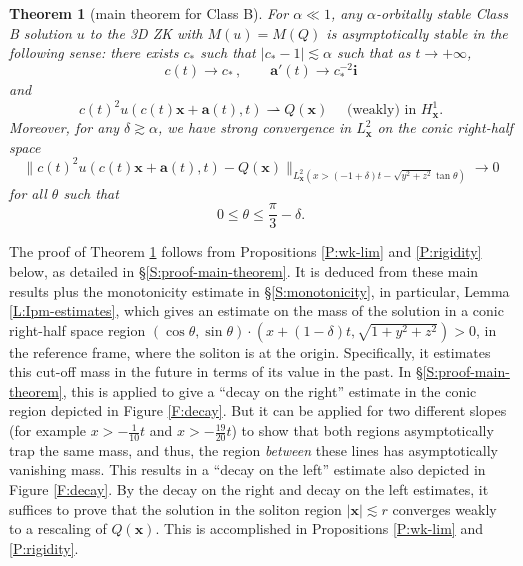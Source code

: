 \documentclass[12pt,letterpaper]{amsart}
\newtheorem{theorem}{Theorem}
\theoremstyle{remark}
\numberwithin{equation}{section}
\numberwithin{theorem}{section}
\numberwithin{table}{section}
\begin{document}
\begin{theorem}[main theorem for Class B]
\label{T:main}
For $\alpha \ll 1$, any $\alpha$-orbitally stable Class B solution $u$ to the 3D ZK with $M(u)=M(Q)$ is \emph{asymptotically stable} in the following sense:  there exists $c_*$ such that $|c_*-1| \lesssim \alpha$ such that as $t\to +\infty$, 
$$
c(t) \to c_* \,,  \qquad \mathbf{a}'(t) \to c_*^{-2} \mathbf{i}
$$
and 
$$
c(t)^2 u(c(t) \mathbf{x} + \mathbf{a}(t),t) \rightharpoonup Q(\mathbf{x}) \quad \text{ (weakly) in } H_{\mathbf{x}}^1.
$$  
Moreover, for any $\delta\gtrsim \alpha$, we have strong convergence in $L^2_{\mathbf{x}}$ on the conic right-half space
\begin{equation}
\label{E:window-conv}
\| c(t)^2 u(c(t) \mathbf{x} + \mathbf{a}(t),t) - Q(\mathbf{x}) \|_{L^2_{\mathbf{x}}(x> (-1+\delta) t -\sqrt{y^2+z^2}\tan \theta )} \to 0
\end{equation}
for all $\theta$ such that 
$$0\leq  \theta \leq \frac{\pi}{3}-\delta.$$
\end{theorem}

The proof of Theorem \ref{T:main} follows from Propositions \ref{P:wk-lim} and \ref{P:rigidity} below, as detailed in \S \ref{S:proof-main-theorem}.  It is deduced from these main results plus the monotonicity estimate in \S\ref{S:monotonicity}, in particular, Lemma \ref{L:Ipm-estimates}, which gives an estimate on the mass of the solution in a conic right-half space region $(\cos \theta, \sin\theta) \cdot (x+(1-\delta) t, \sqrt{1+y^2+z^2})>0$, in the reference frame, where the soliton is at the origin.  Specifically, it estimates this cut-off mass in the future in terms of its value in the past.  In \S \ref{S:proof-main-theorem}, this is applied to give a ``decay on the right'' estimate in the conic region depicted in Figure \ref{F:decay}.  But it can be applied for two different slopes (for example $x>-\frac{1}{10}t$  and $x>-\frac{19}{20}t$) to show that both regions asymptotically trap the same mass, and thus, the region \emph{between} these lines has asymptotically vanishing mass.  This results in a ``decay on the left'' estimate also depicted in Figure \ref{F:decay}.  By the decay on the right and decay on the left estimates, it suffices to prove that the solution in the soliton region $|\mathbf{x}| \lesssim r$ converges weakly to a rescaling of $Q(\mathbf{x})$.  This is accomplished in Propositions \ref{P:wk-lim} and \ref{P:rigidity}.
\end{document}
